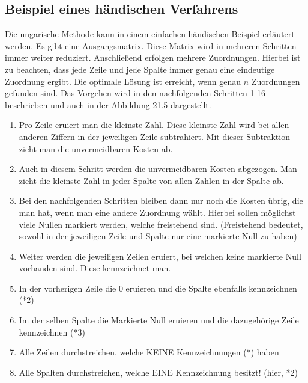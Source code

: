 \subsection{Beispiel eines händischen Verfahrens
\label{munkres:subsection:malorum}}

Die ungarische Methode kann in einem einfachen händischen Beispiel erläutert werden. Es gibt eine Ausgangsmatrix. Diese Matrix wird in mehreren Schritten immer weiter reduziert. Anschließend erfolgen mehrere Zuordnungen. Hierbei ist zu beachten, dass jede Zeile und jede Spalte immer genau eine eindeutige Zuordnung ergibt. Die optimale Lösung ist erreicht, wenn genau $n$ Zuordnungen gefunden sind. Das Vorgehen wird in den nachfolgenden Schritten 1-16 beschrieben und auch in der Abbildung 21.5 dargestellt. 

\begin{enumerate}
\item Pro Zeile eruiert man die kleinste Zahl. Diese kleinste Zahl wird bei
allen anderen Ziffern in der jeweiligen Zeile subtrahiert. Mit dieser Subtraktion zieht man die unvermeidbaren Kosten ab. 

\item Auch in diesem Schritt werden die unvermeidbaren Kosten abgezogen. Man zieht die kleinste Zahl in jeder Spalte von allen Zahlen in der Spalte ab.

\item Bei den nachfolgenden Schritten bleiben dann nur noch die Kosten übrig, die man hat, wenn man eine andere Zuordnung wählt. Hierbei sollen möglichst viele Nullen markiert werden, welche freistehend sind.
(Freistehend bedeutet, sowohl in der jeweiligen Zeile und Spalte nur
eine markierte Null zu haben)

\item Weiter werden die jeweiligen Zeilen eruiert, bei welchen keine markierte Null vorhanden sind. Diese kennzeichnet man.

\item In der vorherigen Zeile die 0 eruieren und die Spalte ebenfalls
kennzeichnen (*2)

\item Im der selben Spalte die Markierte Null eruieren und die dazugehörige
Zeile kennzeichnen (*3)

\item Alle Zeilen durchstreichen, welche KEINE Kennzeichnungen (*) haben

\item Alle Spalten durchstreichen, welche EINE Kennzeichnung besitzt! (hier, *2)


\end{enumerate}
